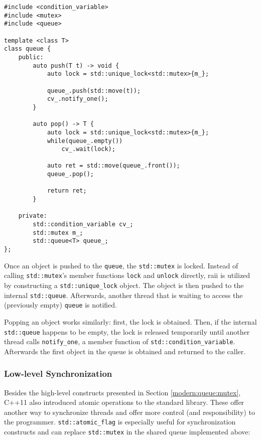 \begin{verbatim}
#include <condition_variable>
#include <mutex>
#include <queue>

template <class T>
class queue {
    public:
        auto push(T t) -> void {
            auto lock = std::unique_lock<std::mutex>{m_};
            
            queue_.push(std::move(t));
            cv_.notify_one();
        }
        
        auto pop() -> T {
            auto lock = std::unique_lock<std::mutex>{m_};
            while(queue_.empty())
                cv_.wait(lock);
                
            auto ret = std::move(queue_.front());
            queue_.pop();
            
            return ret;
        }
        
    private:
        std::condition_variable cv_;
        std::mutex m_;
        std::queue<T> queue_;
};
\end{verbatim}

\noindent Once an object is pushed to the \texttt{queue}, the \texttt{std::mutex} is locked. Instead of calling \texttt{std::mutex}'s member functions \texttt{lock} and \texttt{unlock} directly, \gls{raii} is utilized by constructing a \texttt{std::unique\_lock} object. The object is then pushed to the internal \texttt{std::queue}. Afterwards, another thread that is waiting to access the (previously empty) \texttt{queue} is notified.

Popping an object works similarly: first, the lock is obtained. Then, if the internal \texttt{std::queue} happens to be empty, the lock is released temporarily until another thread calls \texttt{notify\_one}, a member function of \texttt{std::condition\_variable}. Afterwards the first object in the queue is obtained and returned to the caller.

\subsubsection{Low-level Synchronization}\label{modern:queue:atomics}

Besides the high-level constructs presented in Section \ref{modern:queue:mutex}, C++11 also introduced atomic operations to the standard library. These offer another way to synchronize threads and offer more control (and responsibility) to the programmer. \texttt{std::atomic\_flag} is especially useful for synchronization constructs and can replace \texttt{std::mutex} in the shared queue implemented above:

